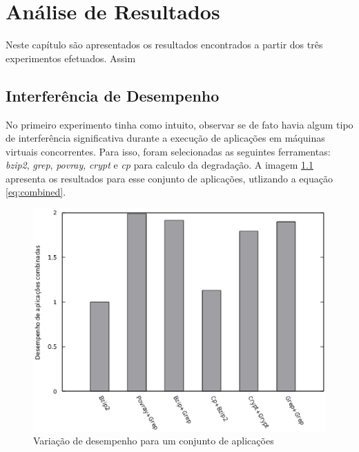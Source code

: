 \chapter{Análise de Resultados}
\label{cap:resultados}
Neste capítulo são apresentados os resultados encontrados a partir dos três experimentos efetuados. Assim  %

\section{Interferência de Desempenho}
No primeiro experimento tinha como intuito, observar se de fato havia algum tipo de interferência significativa durante a execução de aplicações em máquinas virtuais concorrentes. Para isso, foram selecionadas as seguintes ferramentas: \textit{bzip2}, \textit{grep}, \textit{povray}, \textit{crypt} e \textit{cp} para calculo da degradação. A imagem \ref{first_experiment} apresenta os resultados para esse conjunto de aplicações, utlizando a equação \ref{eq:combined}. 

\begin{figure}[!htb]
\centering
\includegraphics [keepaspectratio=true,scale=0.65]{graficos/exp1.eps}
\caption{Variação de desempenho para um conjunto de aplicações}
\label{first_experiment}
\end{figure} 

